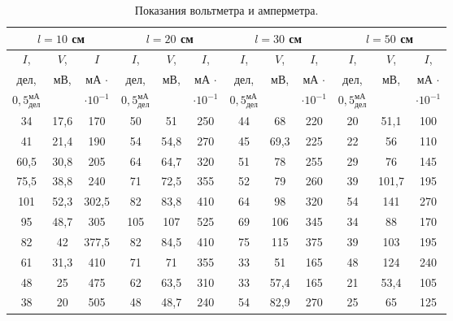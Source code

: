 \documentclass[14pt, a4paper]{scrartcl}
\begin{document}
\begin{table}[H]
\caption{\label{tab:voltmeterampermeter}Показания вольтметра и амперметра.}
\begin{center}
\begin{tabular}{|c|c|c||c|c|c||c|c|c||c|c|c|}
\hline
\multicolumn{3}{|c|}{$l=10$ см}& \multicolumn{3}{|c|}{$l=20$ см} & \multicolumn{3}{|c|}{$l=30$ см} & \multicolumn{3}{|c|}{$l=50$ см}\\
\hline
$I$,&$V$,&$I$ & $I$,&$V$,&$I$, & $I$,&$V$,&$I$, & $I$,&$V$,&$I$,\\
дел, & мВ, & мА $\cdot$ & дел, & мВ, & мА $\cdot$ & дел, & мВ, & мА $\cdot$& дел, & мВ, & мА $\cdot$\\
$0,5_\text{дел}^\text{мА}$&&$\cdot10^{-1}$&$0,5_\text{дел}^\text{мА}$&&$\cdot10^{-1}$&$0,5_\text{дел}^\text{мА}$&&$\cdot10^{-1}$&$0,5_\text{дел}^\text{мА}$&&$\cdot10^{-1}$\\
\hline
34&17,6&170& 50&51&250& 44&68&220& 20&51,1&100\\
\hline
41&21,4&190& 54&54,8&270& 45&69,3&225& 22&56&110\\
\hline
60,5&30,8&205& 64&64,7&320& 51&78&255& 29&76&145\\
\hline
75,5&38,8&240& 71&72,5&355& 52&79&260& 39&101,7&195\\
\hline
101&52,3&302,5& 82&83,8&410& 64&98&320& 54&141&270\\
\hline
95&48,7&305& 105&107&525& 69&106&345& 34&88&170\\
\hline
82&42&377,5& 82&84,5&410& 75&115&375& 39&103&195\\
\hline
61&31,3&410& 71&71&355& 33&51&165& 48&124&240\\
\hline
48&25&475& 62&63,5&310& 33&57,4&165& 21&53,4&105\\
\hline
38&20&505 &48&48,7&240& 54&82,9&270& 25&65&125\\
\hline

\end{tabular}
\end{center}
\end{table}

\paragraph{}
\end{document}

